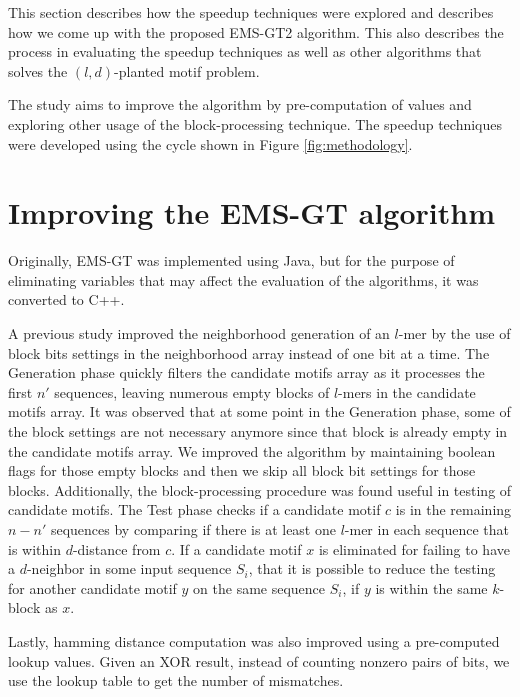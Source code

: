 This section describes how the speedup techniques were explored and describes how we come up with the proposed EMS-GT2 algorithm. This also describes the process in evaluating the speedup techniques as well as other algorithms that solves the $(l, d)$-planted motif problem.




The study aims to improve the algorithm by pre-computation of values and exploring other usage of the block-processing technique. The speedup techniques were developed using the cycle shown in Figure \ref{fig:methodology}.

\section{Improving the EMS-GT algorithm}
Originally, EMS-GT was implemented using Java, but for the purpose of eliminating variables that may affect the evaluation of the algorithms, it was converted to C++. 

A previous study \cite{sia2015} improved the neighborhood generation of an $l$-mer by the use of block bits settings in the neighborhood array instead of one bit at a time. The Generation phase quickly filters the candidate motifs array as it processes the first $n'$ sequences, leaving numerous empty blocks of $l$-mers in the candidate motifs array. It was observed that at some point in the Generation phase, some of the block settings are not necessary anymore since that block is already empty in the candidate motifs array. We improved the algorithm by maintaining boolean flags for those empty blocks and then we skip all block bit settings for those blocks. Additionally, the block-processing procedure was found useful in testing of candidate motifs. The Test phase checks if a candidate motif $c$ is in the remaining $n - n'$ sequences by comparing if there is at least one $l$-mer in each sequence that is within $d$-distance from $c$. If a candidate motif $x$ is eliminated for failing to have a $d$-neighbor in some input sequence $S_i$, that it is possible to reduce the testing for another candidate motif $y$ on the same sequence $S_i$, if $y$ is within the same $k$-block as $x$.

Lastly, hamming distance computation was also improved using a pre-computed lookup values. Given an XOR result, instead of counting nonzero pairs of bits, we use the lookup table to get the number of mismatches. 

